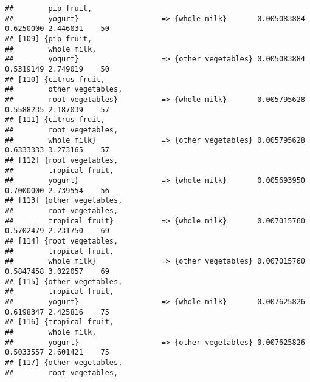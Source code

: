 \documentclass[]{article}
\begin{document}
\begin{verbatim}
##        pip fruit,                                                                           
##        yogurt}                   => {whole milk}       0.005083884  0.6250000 2.446031    50
## [109] {pip fruit,                                                                           
##        whole milk,                                                                          
##        yogurt}                   => {other vegetables} 0.005083884  0.5319149 2.749019    50
## [110] {citrus fruit,                                                                        
##        other vegetables,                                                                    
##        root vegetables}          => {whole milk}       0.005795628  0.5588235 2.187039    57
## [111] {citrus fruit,                                                                        
##        root vegetables,                                                                     
##        whole milk}               => {other vegetables} 0.005795628  0.6333333 3.273165    57
## [112] {root vegetables,                                                                     
##        tropical fruit,                                                                      
##        yogurt}                   => {whole milk}       0.005693950  0.7000000 2.739554    56
## [113] {other vegetables,                                                                    
##        root vegetables,                                                                     
##        tropical fruit}           => {whole milk}       0.007015760  0.5702479 2.231750    69
## [114] {root vegetables,                                                                     
##        tropical fruit,                                                                      
##        whole milk}               => {other vegetables} 0.007015760  0.5847458 3.022057    69
## [115] {other vegetables,                                                                    
##        tropical fruit,                                                                      
##        yogurt}                   => {whole milk}       0.007625826  0.6198347 2.425816    75
## [116] {tropical fruit,                                                                      
##        whole milk,                                                                          
##        yogurt}                   => {other vegetables} 0.007625826  0.5033557 2.601421    75
## [117] {other vegetables,                                                                    
##        root vegetables,                                                                     

\end{verbatim}
\end{document}
